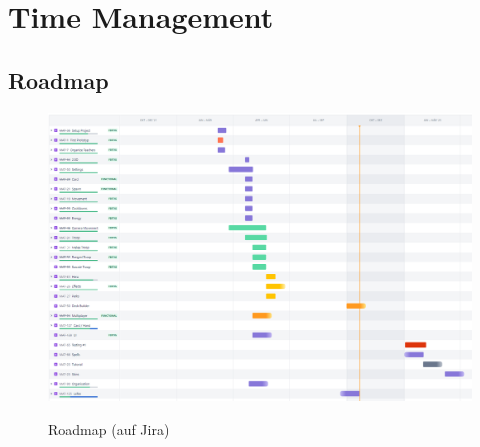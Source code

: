 \chapter{Time Management}

\section{Roadmap}
\begin{figure}[H]
    \centering
    \includegraphics[width=15cm]{resources/roadmap_r.png}\\
    \caption{Roadmap (auf Jira)}
\end{figure}    


